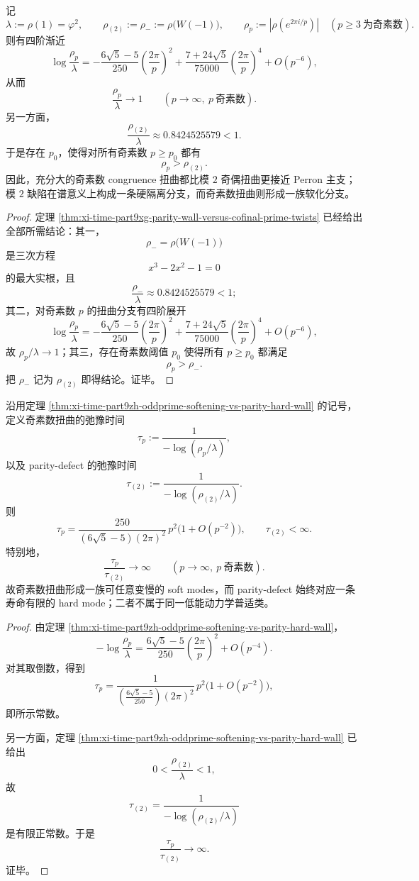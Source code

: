 \begin{theorem}\label{thm:xi-time-part9zh-oddprime-softening-vs-parity-hard-wall}
记
\[
\lambda:=\rho(1)=\varphi^2,
\qquad
\rho_{(2)}:=\rho_-:=\rho\!\bigl(W(-1)\bigr),
\qquad
\rho_p:=\left|\rho\!\left(e^{2\pi i/p}\right)\right|
\quad (p\ge 3\ \text{为奇素数}).
\]
则有四阶渐近
\[
\log\frac{\rho_p}{\lambda}
=
-\frac{6\sqrt5-5}{250}\left(\frac{2\pi}{p}\right)^2
+\frac{7+24\sqrt5}{75000}\left(\frac{2\pi}{p}\right)^4
+O(p^{-6}),
\]
从而
\[
\frac{\rho_p}{\lambda}\longrightarrow 1
\qquad (p\to\infty,\ p\ \text{奇素数}).
\]
另一方面，
\[
\frac{\rho_{(2)}}{\lambda}\approx 0.8424525579<1.
\]
于是存在 \(p_0\)，使得对所有奇素数 \(p\ge p_0\) 都有
\[
\rho_p>\rho_{(2)}.
\]
因此，充分大的奇素数 congruence 扭曲都比模 \(2\) 奇偶扭曲更接近 Perron 主支；模 \(2\) 缺陷在谱意义上构成一条硬隔离分支，而奇素数扭曲则形成一族软化分支。
\end{theorem}
\begin{proof}
定理 \ref{thm:xi-time-part9xg-parity-wall-versus-cofinal-prime-twists} 已经给出全部所需结论：其一，
\[
\rho_-=\rho\!\bigl(W(-1)\bigr)
\]
是三次方程
\[
x^3-2x^2-1=0
\]
的最大实根，且
\[
\frac{\rho_-}{\lambda}\approx 0.8424525579<1;
\]
其二，对奇素数 \(p\) 的扭曲分支有四阶展开
\[
\log\frac{\rho_p}{\lambda}
=
-\frac{6\sqrt5-5}{250}\left(\frac{2\pi}{p}\right)^2
+\frac{7+24\sqrt5}{75000}\left(\frac{2\pi}{p}\right)^4
+O(p^{-6}),
\]
故 \(\rho_p/\lambda\to 1\)；其三，存在奇素数阈值 \(p_0\) 使得所有 \(p\ge p_0\) 都满足
\[
\rho_p>\rho_-.
\]
把 \(\rho_-\) 记为 \(\rho_{(2)}\) 即得结论。证毕。
\end{proof}

\begin{corollary}\label{cor:xi-time-part9zh-oddprime-p2-relaxation-vs-parity-lifetime}
沿用定理 \ref{thm:xi-time-part9zh-oddprime-softening-vs-parity-hard-wall} 的记号，定义奇素数扭曲的弛豫时间
\[
\tau_p:=\frac{1}{-\log(\rho_p/\lambda)},
\]
以及 parity-defect 的弛豫时间
\[
\tau_{(2)}:=\frac{1}{-\log(\rho_{(2)}/\lambda)}.
\]
则
\[
\tau_p=
\frac{250}{(6\sqrt5-5)(2\pi)^2}\,p^2\bigl(1+O(p^{-2})\bigr),
\qquad
\tau_{(2)}<\infty.
\]
特别地，
\[
\frac{\tau_p}{\tau_{(2)}}\longrightarrow\infty
\qquad (p\to\infty,\ p\ \text{奇素数}).
\]
故奇素数扭曲形成一族可任意变慢的 soft modes，而 parity-defect 始终对应一条寿命有限的 hard mode；二者不属于同一低能动力学普适类。
\end{corollary}
\begin{proof}
由定理 \ref{thm:xi-time-part9zh-oddprime-softening-vs-parity-hard-wall}，
\[
-\log\frac{\rho_p}{\lambda}
=
\frac{6\sqrt5-5}{250}\left(\frac{2\pi}{p}\right)^2
+O(p^{-4}).
\]
对其取倒数，得到
\[
\tau_p
=
\frac{1}{\left(\frac{6\sqrt5-5}{250}\right)(2\pi)^2}\,p^2
\bigl(1+O(p^{-2})\bigr),
\]
即所示常数。

另一方面，定理
\ref{thm:xi-time-part9zh-oddprime-softening-vs-parity-hard-wall}
已给出
\[
0<\frac{\rho_{(2)}}{\lambda}<1,
\]
故
\[
\tau_{(2)}=\frac{1}{-\log(\rho_{(2)}/\lambda)}
\]
是有限正常数。于是
\[
\frac{\tau_p}{\tau_{(2)}}\to\infty.
\]
证毕。
\end{proof}

